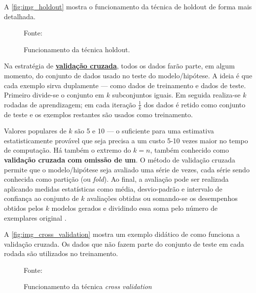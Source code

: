 A \autoref{fig:img_holdout} mostra o funcionamento da técnica de holdout de forma mais detalhada.
\begin{figure}[h!]
	\centering
	\caption{Funcionamento da técnica holdout.}
	
	{\scriptsize Fonte:\cite{aprenda_mineracao_fernando_amaral16}}
	\label{fig:img_holdout}
\end{figure}

Na estratégia de \textbf{\underline{validação cruzada}}, todos os dados farão parte, em algum momento, do conjunto de dados usado no teste do modelo/hipótese. A ideia é que cada exemplo sirva duplamente --- como dados de treinamento e dados de teste. Primeiro divide-se o conjunto em $k$ subconjuntos iguais. Em seguida realiza-se $k$ rodadas de aprendizagem; em cada iteração $\frac{1}{k}$ dos dados é retido como conjunto de teste e os exemplos restantes são usados como treinamento. 

Valores populares de $k$ são 5 e 10 --- o suficiente para uma estimativa estatisticamente provável que seja precisa a um custo 5-10 vezes maior no tempo de computação. Há também o extremo do $k = n$, também conhecido como \textbf{validação cruzada com omissão de um}. O método de validação cruzada permite que o modelo/hipótese seja avaliado uma série de vezes, cada série sendo conhecida como partição (ou \textit{fold}). Ao final, a avaliação pode ser realizada aplicando medidas estatísticas como média, desvio-padrão e intervalo de confiança ao conjunto de $k$ avaliações obtidas ou somando-se os desempenhos obtidos pelos $k$ modelos gerados e dividindo essa soma pelo número de exemplares original \cite{Norvig2013}\cite{Boscarioli2017}\cite{ferrari2017} \cite{aprenda_mineracao_fernando_amaral16}.

A \autoref{fig:img_cross_validation} mostra um exemplo didático de como funciona a validação cruzada. Os dados que não fazem parte do conjunto de teste em cada rodada são utilizados no treinamento.

\begin{figure}[h!]
	\centering
	\caption{Funcionamento da técnica \textit{cross validation}}
	
	{\scriptsize Fonte: \cite{fold_cross_validation:k-fold_nodate}}
	\label{fig:img_cross_validation}
\end{figure}

